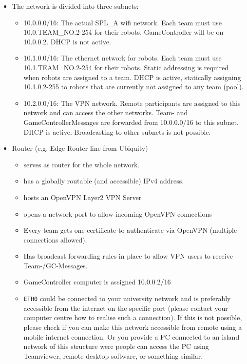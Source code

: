 \begin{itemize}
    \item  The network is divided into three subnets:
    \begin{itemize}
        \item 10.0.0.0/16: The actual SPL\_A wifi network. Each team must use 10.0.TEAM\_NO.2-254 for their robots. GameController will be on 10.0.0.2. DHCP is not active.
        \item 10.1.0.0/16: The ethernet network for robots. Each team must use 10.1.TEAM\_NO.2-254 for their robots. Static addressing is required when robots are assigned to a team. DHCP is active, statically assigning 10.1.0.2-255 to robots that are currently not assigned to any team (pool).
        \item 10.2.0.0/16: The VPN network. Remote participants are assigned to this network and can access the other networks. Team- and GameControllerMessages are forwarded from 10.0.0.0/16 to this subnet. DHCP is active. Broadcasting to other subnets is not possible.
    \end{itemize}
    \item Router (e.g. Edge Router line from Ubiquity)
    \begin{itemize}
        \item serves as router for the whole network.
        \item has a globally routable (and accessible) IPv4 address.
        \item hosts an OpenVPN Layer2 VPN Server
        \item opens a network port to allow incoming OpenVPN connections
        \item Every team gets one certificate to authenticate via OpenVPN (multiple connections allowed).
        \item Has broadcast forwarding rules in place to allow VPN users to receive Team-/GC-Messages.
        \item GameController computer is assigned 10.0.0.2/16
        \item \texttt{ETH0} could be connected to your university network and is preferably accessible from the internet on the specific port (please contact your computer centre how to realise such a connection). If this is not possible, please check if you can make this network accessible from remote using a mobile internet connection. Or you provide a PC connected to an island network of this structure were people can access the PC using Teamviewer, remote desktop software, or something similar. 
    \end{itemize}
\end{itemize}

